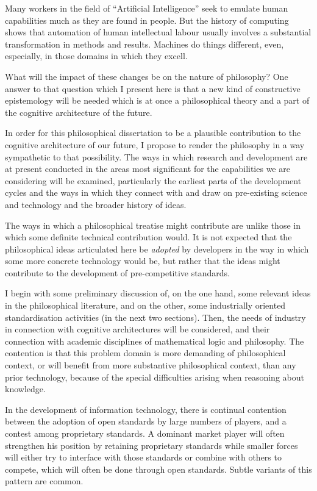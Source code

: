 {Many workers in the field of ``Artificial Intelligence'' seek to emulate
human capabilities much as they are found in people.
But the history of computing shows that automation of human intellectual labour
usually involves a substantial transformation in methods and results.
Machines do things different, even, especially, in those domains in which they
excell.

What will the impact of these changes be on the nature of philosophy?
One answer to that question which I present here is that a new kind of
constructive epistemology will be needed which is at once a philosophical
theory and a part of the cognitive architecture of the future.

In order for this philosophical dissertation to be a plausible contribution
to the cognitive architecture of our future, I propose to render the philosophy
in a way sympathetic to that possibility.
The ways in which research and development are at present conducted in the
areas most significant for the capabilities we are considering will be examined,
particularly the earliest parts of the development cycles and the ways in which
they connect with and draw on pre-existing science and technology and the
broader history of ideas.

The ways in which a philosophical treatise might contribute are unlike those in
which some definite technical contribution would.
It is not expected that the philosophical ideas articulated here be {\it adopted} by developers
in the way in which some more concrete technology would be, but rather that
the ideas might contribute to the development of pre-competitive standards.

I begin with some preliminary discussion of, on the one hand, some relevant
ideas in the philosophical literature, and on the other, some industrially
oriented standardisation activities (in the next two sections).
Then, the needs of industry in connection with cognitive architectures will
be considered, and their connection with academic disciplines of mathematical
logic and philosophy.
The contention is that this problem domain is more demanding of philosophical
context, or will benefit from more substantive philosophical context, than any
 prior technology, because of the special difficulties arising when reasoning
about knowledge.

In the development of information technology, there is continual contention between
the adoption of open standards by large numbers of players, and a contest among
proprietary standards.
A dominant market player will often strengthen his position by retaining proprietary
standards while smaller forces will either try to interface with those standards
or combine with others to compete, which will often be done through open standards.
Subtle variants of this pattern are common.

}
